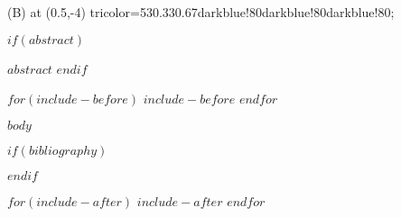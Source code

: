 \documentclass[
$if(fontsize)$
$fontsize$,
$endif$
$if(lang)$
$babel-lang$,
$endif$
$for(classoption)$
$classoption$$sep$,
$endfor$
a4paper]{article}
\renewenvironment{abstract}
 {\small
  \begin{flushleft}
  \bfseries \abstractname\vspace{-0.5em}\vspace{0pt}
  \end{flushleft}
  \list{}{
    \setlength{\leftmargin}{.0cm}
    \setlength{\rightmargin}{\leftmargin}
  }
  \item\relax}
 {\endlist}
\begin{document}
\begin{center}
  \begin{minipage}{19cm}
  \pic[rounded corners=0.5cm] (B) at (0.5,-4) {tricolor={5}{3}{0.33}{0.67}{darkblue!80}{darkblue!80}{darkblue!80}};
  \end{minipage}\hfill
\end{center}

$if(abstract)$
\begin{abstract}
$abstract$
\end{abstract}
$endif$


$for(include-before)$
  $include-before$
$endfor$


$body$

\clearpage

$if(bibliography)$
  
  
$endif$


$for(include-after)$
  $include-after$
$endfor$
\end{document}

